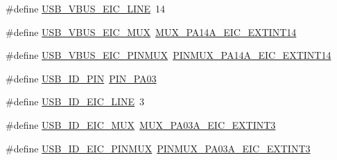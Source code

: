 \begin{DoxyCompactItemize}
\item 
\#define \mbox{\hyperlink{group__samd21__xplained__pro__features__group_ga8059afaf0b2d03579635acc08740299e}{U\+S\+B\+\_\+\+V\+B\+U\+S\+\_\+\+E\+I\+C\+\_\+\+L\+I\+NE}}~14
\item 
\#define \mbox{\hyperlink{group__samd21__xplained__pro__features__group_gacf465ba3dac5d96582bdb94d7b826d12}{U\+S\+B\+\_\+\+V\+B\+U\+S\+\_\+\+E\+I\+C\+\_\+\+M\+UX}}~\mbox{\hyperlink{pio_2samd21j18a_8h_afeb03044b3ae72cc083bf75edd71caf2}{M\+U\+X\+\_\+\+P\+A14\+A\+\_\+\+E\+I\+C\+\_\+\+E\+X\+T\+I\+N\+T14}}
\item 
\#define \mbox{\hyperlink{group__samd21__xplained__pro__features__group_ga2582d6c6524bdd643b5982b664fc15b1}{U\+S\+B\+\_\+\+V\+B\+U\+S\+\_\+\+E\+I\+C\+\_\+\+P\+I\+N\+M\+UX}}~\mbox{\hyperlink{pio_2samd21j18a_8h_acd04dc85dd82af514fd78127a6d13449}{P\+I\+N\+M\+U\+X\+\_\+\+P\+A14\+A\+\_\+\+E\+I\+C\+\_\+\+E\+X\+T\+I\+N\+T14}}
\item 
\#define \mbox{\hyperlink{group__samd21__xplained__pro__features__group_ga4b602bd00c1d882e9f0f602f1ef49c3c}{U\+S\+B\+\_\+\+I\+D\+\_\+\+P\+IN}}~\mbox{\hyperlink{pio_2samd21j18a_8h_a32b9f520e39b943f78a864645721a9d6}{P\+I\+N\+\_\+\+P\+A03}}
\item 
\#define \mbox{\hyperlink{group__samd21__xplained__pro__features__group_gabc97d0dc35b2b137316fe7533b216147}{U\+S\+B\+\_\+\+I\+D\+\_\+\+E\+I\+C\+\_\+\+L\+I\+NE}}~3
\item 
\#define \mbox{\hyperlink{group__samd21__xplained__pro__features__group_gab8aadfcac55556ad80908c8fe661ca48}{U\+S\+B\+\_\+\+I\+D\+\_\+\+E\+I\+C\+\_\+\+M\+UX}}~\mbox{\hyperlink{pio_2samd21j18a_8h_adda8e3425b85e2ce6239e5545ead9df3}{M\+U\+X\+\_\+\+P\+A03\+A\+\_\+\+E\+I\+C\+\_\+\+E\+X\+T\+I\+N\+T3}}
\item 
\#define \mbox{\hyperlink{group__samd21__xplained__pro__features__group_gad65c9cfa4de471cbae8443e824b61e15}{U\+S\+B\+\_\+\+I\+D\+\_\+\+E\+I\+C\+\_\+\+P\+I\+N\+M\+UX}}~\mbox{\hyperlink{pio_2samd21j18a_8h_ad84a5e1ff52843fbb3efbad78fd3060c}{P\+I\+N\+M\+U\+X\+\_\+\+P\+A03\+A\+\_\+\+E\+I\+C\+\_\+\+E\+X\+T\+I\+N\+T3}}
\end{DoxyCompactItemize}
